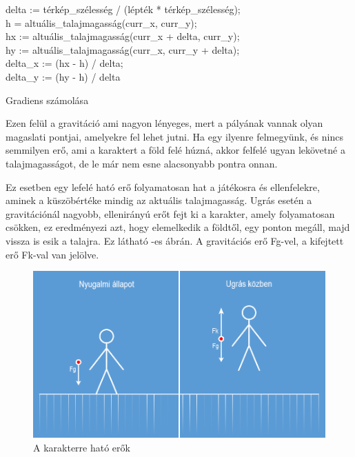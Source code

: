 \begin{algorithm}[H]
 	delta := térkép\_szélesség / (lépték * térkép\_szélesség);\\
 	h = altuális\_talajmagasság(curr\_x, curr\_y);\\
	hx := altuális\_talajmagasság(curr\_x + delta, curr\_y);\\
	hy := altuális\_talajmagasság(curr\_x, curr\_y + delta);\\
	delta\_x := (hx - h) / delta;\\
	delta\_y := (hy - h) / delta\; 
 \caption{Gradiens számolása}
\end{algorithm} 


Ezen felül a gravitáció ami nagyon lényeges, mert a pályának vannak olyan magaslati pontjai, amelyekre fel lehet jutni. Ha egy ilyenre felmegyünk, és nincs semmilyen erő, ami a karaktert a föld felé húzná, akkor felfelé ugyan lekövetné a talajmagasságot, de le már nem esne alacsonyabb pontra onnan.

Ez esetben egy lefelé ható erő folyamatosan hat a játékosra és ellenfelekre, aminek a küszöbértéke mindig az aktuális talajmagasság. Ugrás esetén a gravitációnál nagyobb, ellenirányú erőt fejt ki a karakter, amely folyamatosan csökken, ez eredményezi azt, hogy elemelkedik a földtől, egy ponton megáll, majd vissza is esik a talajra. Ez látható -es ábrán. A gravitációs erő Fg-vel, a kifejtett erő Fk-val van jelölve.

\begin{figure}[h]
\centering
\includegraphics[scale=0.6]{kepek/gravity.png}
\caption{A karakterre ható erők}
\label{fig:gravity}
\end{figure}


